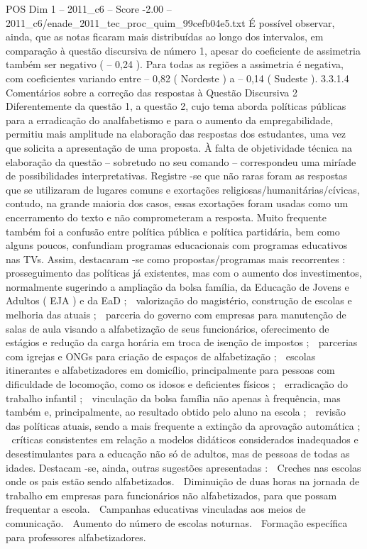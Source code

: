 \begin{textsample}{POS Dim 1 – 2011\_c6 – Score -2.00 – 2011\_c6/enade\_2011\_tec\_proc\_quim\_99cefb04e5.txt}
É possível observar, ainda, que as notas ficaram mais distribuídas ao longo dos intervalos, em comparação à questão discursiva de número 1, apesar do coeficiente de assimetria também ser negativo ( – 0,24 ).
Para todas as regiões a assimetria é negativa, com coeficientes variando entre – 0,82 ( Nordeste ) a – 0,14 ( Sudeste ). 3.3.1.4 Comentários sobre a correção das respostas à Questão Discursiva 2 Diferentemente da questão 1, a questão 2, cujo tema aborda políticas públicas para a erradicação do analfabetismo e para o aumento da empregabilidade, permitiu mais amplitude na elaboração das respostas dos estudantes, uma vez que solicita a apresentação de uma proposta.
À falta de objetividade técnica na elaboração da questão – sobretudo no seu comando – correspondeu uma miríade de possibilidades interpretativas.
Registre -se que não raras foram as respostas que se utilizaram de lugares comuns e exortações religiosas/humanitárias/cívicas, contudo, na grande maioria dos casos, essas exortações foram usadas como um encerramento do texto e não comprometeram a resposta.
Muito frequente também foi a confusão entre política pública e política partidária, bem como alguns poucos, confundiam programas educacionais com programas educativos nas TVs.
Assim, destacaram -se como propostas/programas mais recorrentes :  prosseguimento das políticas já existentes, mas com o aumento dos investimentos, normalmente sugerindo a ampliação da bolsa família, da Educação de Jovens e Adultos ( EJA ) e da EaD ;  valorização do magistério, construção de escolas e melhoria das atuais ;  parceria do governo com empresas para manutenção de salas de aula visando a alfabetização de seus funcionários, oferecimento de estágios e redução da carga horária em troca de isenção de impostos ;  parcerias com igrejas e ONGs para criação de espaços de alfabetização ;  escolas itinerantes e alfabetizadores em domicílio, principalmente para pessoas com dificuldade de locomoção, como os idosos e deficientes físicos ;  erradicação do trabalho infantil ;  vinculação da bolsa família não apenas à frequência, mas também e, principalmente, ao resultado obtido pelo aluno na escola ;  revisão das políticas atuais, sendo a mais frequente a extinção da aprovação automática ;  críticas consistentes em relação a modelos didáticos considerados inadequados e desestimulantes para a educação não só de adultos, mas de pessoas de todas as idades.
Destacam -se, ainda, outras sugestões apresentadas :  Creches nas escolas onde os pais estão sendo alfabetizados.  Diminuição de duas horas na jornada de trabalho em empresas para funcionários não alfabetizados, para que possam frequentar a escola.  Campanhas educativas vinculadas aos meios de comunicação.  Aumento do número de escolas noturnas.  Formação específica para professores alfabetizadores.

\end{textsample}
